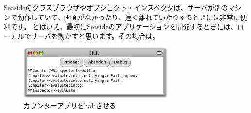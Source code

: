 \documentclass[a4paper,10pt,twoside]{book}
\begin{document}
Seasideのクラスブラウザやオブジェクト・インスペクタは、サーバが別のマシンで動作していて、画面がなかったり、遠く離れていたりするときには非常に便利です。
とはいえ、最初にSeasideのアプリケーションを開発するときには、ローカルでサーバを動かすと思います。その場合は。

\begin{figure}[ht]
\begin{center}
\includegraphics[width=0.7\textwidth]{haltingCounter}
\caption{カウンターアプリをhaltさせる}
\end{center}
\end{figure}
\end{document}
